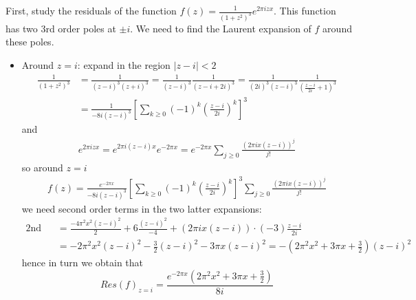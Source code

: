 \documentclass[11pt,a4paper]{article}
\begin{document}
First, study the residuals of the function $f(z) = \frac{1}{(1+z^2)^3} e^{2\pi i z x}$. This function has two 3rd order poles at $\pm i$. We need to find the Laurent expansion of $f$ around these poles.
\begin{itemize}
    \item Around $z=i$: expand in the region $\lvert z-i\rvert <2$
    \begin{align*}
        \frac{1}{(1+z^2)^3} &= \frac{1}{(z-i)^3(z+i)^3} = \frac{1}{(z-i)^3}\frac{1}{(z-i+2i)^3} = \frac{1}{(2i)^3(z-i)^3}\frac{1}{(\frac{z-i}{2i}+1)^3} \\
        &=\frac{1}{-8i(z-i)^3} \left[\sum_{k\ge0} (-1)^k \left(\frac{z-i}{2i}\right)^k\right]^3
    \end{align*}
    and
    \begin{align*}
        e^{2\pi i zx} = e^{2\pi i (z-i)x} e^{-2\pi x} = e^{-2\pi x} \sum_{j\ge 0} \frac{(2\pi i x(z-i))^j}{j!}
    \end{align*}
    so around $z=i$
    \begin{align*}
        f(z) = \frac{e^{-2\pi x}}{-8i(z-i)^3} \left[\sum_{k\ge0} (-1)^k \left(\frac{z-i}{2i}\right)^k\right]^3 \sum_{j\ge 0} \frac{(2\pi i x(z-i))^j}{j!}
    \end{align*}
    we need second order terms in the two latter expansions:
    \begin{align*}
        \text{2nd order terms} &= \frac{-4\pi^2x^2(z-i)^2}{2} + 6\frac{(z-i)^2}{-4} + (2\pi i x(z-i))\cdot (-3)\frac{z-i}{2i} \\
        &=-2\pi^2 x^2 (z-i)^2 - \frac{3}{2}(z-i)^2 -3\pi x(z-i)^2 = -(2\pi^2 x^2 + 3\pi x + \frac{3}{2})(z-i)^2
    \end{align*}
    hence in turn we obtain that
    \begin{equation*}
        Res(f)_{z=i} = \frac{e^{-2\pi x}(2\pi^2 x^2 + 3\pi x + \frac{3}{2})}{8i}
    \end{equation*}
    

\end{itemize}
\end{document}
